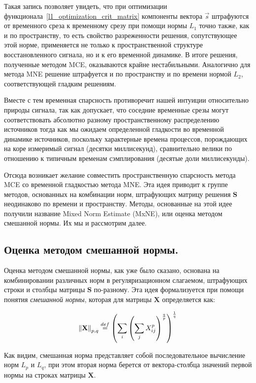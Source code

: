 Такая запись позволяет увидеть, что при оптимизации
функционала~\ref{l1_optimization_crit_matrix} компоненты вектора $\vec{s}$
штрафуются от временного среза к временному срезу при помощи нормы $L_1$ точно
также, как и по пространству, то есть свойство разреженности решения,
сопутствующее этой норме, применяется не только к пространственной структуре
восстановленного сигнала, но и к его временной динамике. В итоге решения,
полученные методом MCE, оказываются крайне нестабильными. Аналогично для метода
MNE решение штрафуется и по пространству и по времени нормой $L_2$, соответствующей
гладким решениям.

Вместе с тем временная спарсность противоречит нашей интуиции относительно
природы сигнала, так как допускает, что соседние временные срезы могут
соответствовать абсолютно разному пространственному распределению источников
тогда как мы ожидаем определенной гладкости во временной динамике источников,
поскольку характерные времена процессов, порождающих на коре
измеримый сигнал (десятки миллисекунд), сравнительно велики по отношению к типичным временам
сэмплирования (десятые доли миллисекунды).

Отсюда возникает желание совместить пространственную спарсность метода
MCE со временной гладкостью метода MNE. Эта идея приводит к группе методов,
основанных на комбинации норм, штрафующих матрицу решения $\mathbf{S}$
неодинаково по времени и пространству. Методы, основанные на этой идее получили
название Mixed Norm Estimate (MxNE), или оценка методом смешанной нормы. Их мы и
рассмотрим далее.

\subsection{Оценка методом смешанной нормы.}
\label{section_mixed_norm}

Оценка методом смешанной нормы, как уже было сказано, основана на
комбинировании различных норм в регуляризационном слагаемом, штрафующих строки
и столбцы матрицы $\mathbf{S}$ по-разному.  Эта идея формализуется при помощи понятия
\emph{смешанной нормы}, которая для матрицы $\mathbf{X}$ определяется как:

\begin{equation}
    \left\lVert\mathbf{X}\right\rVert_{p,q} \stackrel{def}{=}
    \left(\sum_i \left( \sum_j X_{ij}^p \right)^{\frac{q}{p}}\right)^{\frac{1}{q}}
    \label{mixed_norm_def}
\end{equation}

Как видим, смешанная норма представляет собой последовательное вычисление
норм $L_p$ и $L_q$, при этом вторая норма берется от вектора-столбца значений первой
нормы на строках матрицы $\mathbf{X}$.

